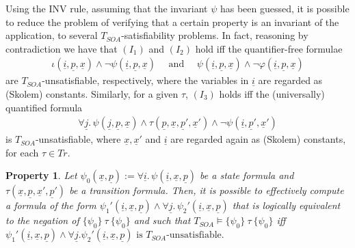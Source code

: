 \documentclass[conference]{IEEEtran}
\newtheorem{property}{Property}
\newcommand{\close}{\IEEEQEDclosed}
\begin{document}
Using the INV rule, assuming that the invariant $\psi$ has been
guessed, it is possible to reduce the problem of verifying that a
certain property is an invariant of the application, to several
$T_\mathit{SOA}$-satisfiability problems.  In fact, reasoning by
contradiction we have that $(I_1)$ and $(I_2)$ hold iff the
quantifier-free formulae
\begin{eqnarray*}
  \iota(\underline{i},\underline{p},\underline{x}) \wedge 
  \neg \psi(\underline{i},\underline{p},\underline{x}) \quad \mbox{ and } \quad
  \psi(\underline{i},\underline{p},\underline{x})  \wedge 
  \neg \varphi(\underline{i},\underline{p},\underline{x})
\end{eqnarray*}
are $T_\mathit{SOA}$-unsatisfiable, respectively, where the variables in
$\underline{i}$ are regarded as (Skolem) constants.  Similarly,
for a given $\tau$, $(I_3)$ holds iff the (universally) quantified
formula
\begin{eqnarray*}
  \forall \underline{j}.\, \psi(\underline{j},\underline{p},\underline{x}) \wedge
  \tau(\underline{p},\underline{x},\underline{p}',\underline{x}') 
  \wedge
  \neg \psi(\underline{i}, \underline{p}',\underline{x}') 
\end{eqnarray*}
is $T_\mathit{SOA}$-unsatisfiable, where $\underline{x},\underline{x}'$ and
$\underline{i}$ are regarded again as (Skolem) constants, for each
$\tau\in \mathit{Tr}$.  
\begin{property}\label{property:sat}
  Let $\psi_0(\underline{x},\underline{p}) :=\forall
  \underline{i}.\,\psi(\underline{i},\underline{x},\underline{p})$ be a
  state formula and
  $\tau(\underline{x},\underline{p},\underline{x}',\underline{p}')$ be
  a transition formula.  Then, it is possible to effectively compute a
  formula of the form
  $\psi_1'(\underline{i},\underline{x},\underline{p})\wedge \forall
  \underline{j}.\,\psi_2'(\underline{i},\underline{x},\underline{p})$
  that is logically equivalent to the negation of $\{ \psi_0 \}
  ~\tau~ \{ \psi_0 \}$ and such that
   $T_\mathit{SOA}\models \{ \psi_0 \} ~\tau~ \{ \psi_0 \}$ iff 
    $\psi_1'(\underline{i},\underline{x},\underline{p})\wedge 
    \forall \underline{j}.\psi_2'(\underline{i},\underline{x},\underline{p})
    \mbox{ is $T_\mathit{SOA}$-unsatisfiable.}$
\hfill \close
\end{property}
\end{document}
